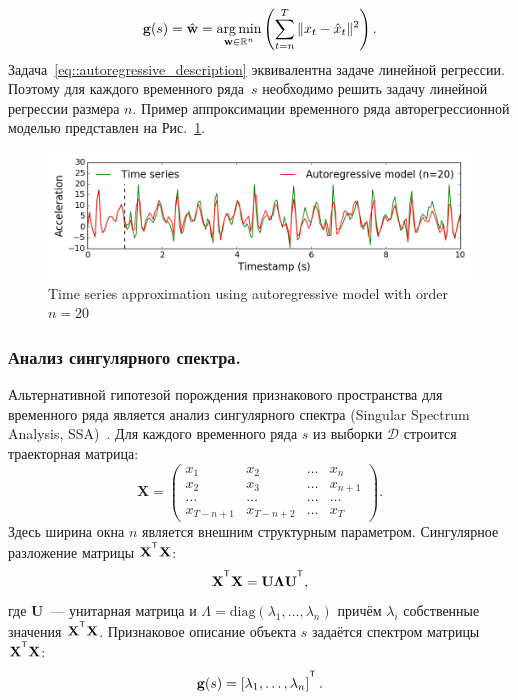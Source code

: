 \begin{equation}
\mathbf{g}(s) = \hat{\mathbf{w}} = \mathop{\arg \min}\limits_{\mathbf{w} \in \mathbb{R}^{n}} \left( \sum_{t=n}^{T} \|x_t - \hat{x}_t\|^2\right).
\label{eq::autoregressive_description}
\end{equation}
Задача~\eqref{eq::autoregressive_description} эквивалентна задаче линейной регрессии.
Поэтому для каждого временного ряда~$s$ необходимо решить задачу линейной регрессии размера $n$.
Пример аппроксимации временного ряда авторегрессионной моделью представлен на Рис.~\ref{fig::ar_example}.

\begin{figure}[ht]
	\centering
	\includegraphics[width=1\linewidth]{figs/ch5/ar_example.png}
	\caption{Time series approximation using autoregressive model with order $n = 20$}
	\label{fig::ar_example}
\end{figure}

\subsubsection{Анализ сингулярного спектра.}
Альтернативной гипотезой порождения признакового пространства для временного ряда является анализ сингулярного спектра (Singular Spectrum Analysis, SSA)~\cite{hassani2007singular}. 
Для каждого временного ряда $s$ из выборки $\mathcal{D}$ строится траекторная матрица:
\[
\mathbf{X} = 
\begin{pmatrix}
x_1 & x_2 & \dots & x_n \\
x_2 & x_3 & \dots & x_{n+1} \\
\dots & \dots & \dots & \dots \\
x_{T-n+1} & x_{T-n+2} & \dots & x_T
\end{pmatrix}.
\]
Здесь ширина окна $n$ является внешним структурным параметром.
Сингулярное разложение матрицы $\mathbf{X}^{\T} \mathbf{X}$:
\[
\mathbf{X}^{\T} \mathbf{X} = \mathbf{U} \mathbf{\Lambda} \mathbf{U}^{\T},
\]
где $\mathbf{U}$~--- унитарная матрица и $\Lambda = \mathrm{diag}(\lambda_1, \dots, \lambda_n)$ причём $\lambda_i$ собственные значения $\mathbf{X}^{\T} \mathbf{X}$. 
Признаковое описание объекта $s$ задаётся спектром матрицы $\mathbf{X}^{\T} \mathbf{X}$:
\[
\mathbf{g}(s) = \left[\lambda_1, \dots, \lambda_n\right]^{\T}.
\]

